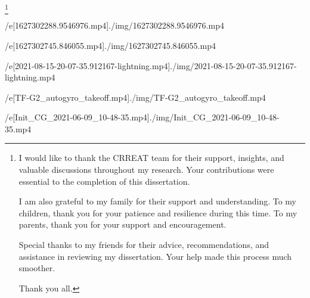 

\thanks{
I would like to thank the CRREAT team for their support, insights, and valuable discussions throughout my research. Your contributions were essential to the completion of this dissertation.

I am also grateful to my family for their support and understanding. To my children, thank you for your patience and resilience during this time. To my parents, thank you for your support and encouragement.

Special thanks to my friends for their advice, recommendations, and assistance in reviewing my dissertation. Your help made this process much smoother.

Thank you all.
}

\def\mycite[#1]{{\null\def\_addcitelist##1{}\nonumcitations\unskip\cite[#1]}}
\def\specialbibs{\bibnum=1000
   \def\_printbib{\hangindent=2\iindent
      \noindent\hskip2\iindent \llap{[\the\bibmark] }}%
}


\def\printcaption#1#2{\leftskip=\iindent \rightskip=\iindent
   \setbox0=\hbox\bgroup \aftergroup\docaption{\bf#1 #2.}\enspace}
\def\docaption{\tmpdim=\hsize \advance\tmpdim by-2\iindent
   \ifdim\wd0>\tmpdim \unhbox0 \else \hfil\hfil\unhbox0 \fi \endgraf \egroup}




\filedef/e[1627302288.9546976.mp4]{./img/1627302288.9546976.mp4}
\attach[1627302288.9546976.mp4]

\filedef/e[1627302745.846055.mp4]{./img/1627302745.846055.mp4}
\attach[1627302745.846055.mp4]

\filedef/e[2021-08-15-20-07-35.912167-lightning.mp4]{./img/2021-08-15-20-07-35.912167-lightning.mp4}
\attach[2021-08-15-20-07-35.912167-lightning.mp4]

\filedef/e[TF-G2_autogyro_takeoff.mp4]{./img/TF-G2_autogyro_takeoff.mp4}

\filedef/e[Init_CG_2021-06-09_10-48-35.mp4]{./img/Init_CG_2021-06-09_10-48-35.mp4}
\attach[Init_CG_2021-06-09_10-48-35.mp4]

